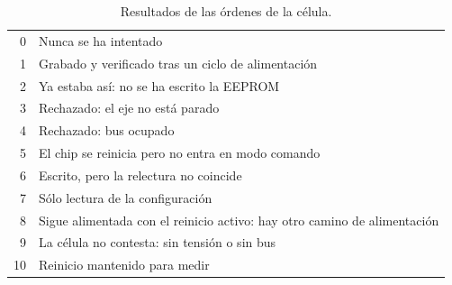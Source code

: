 \begin{table}[H]
\centering
\caption{Resultados de las órdenes de la célula.}
\label{tab:lcres}
\begin{tabular}{@{}rl@{}}
\toprule
0 & Nunca se ha intentado \\
1 & Grabado y verificado tras un ciclo de alimentación \\
2 & Ya estaba así: no se ha escrito la EEPROM \\
3 & Rechazado: el eje no está parado \\
4 & Rechazado: bus ocupado \\
5 & El chip se reinicia pero no entra en modo comando \\
6 & Escrito, pero la relectura no coincide \\
7 & Sólo lectura de la configuración \\
8 & Sigue alimentada con el reinicio activo: hay otro camino de alimentación \\
9 & La célula no contesta: sin tensión o sin bus \\
10 & Reinicio mantenido para medir \\
\bottomrule
\end{tabular}
\end{table}
